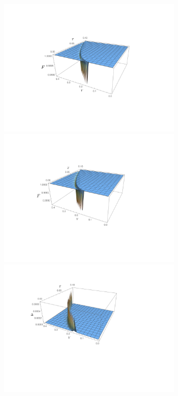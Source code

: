 \begin{figure}[h!]
\begin{minipage}{0.24\textwidth}
\includegraphics[width=0.8\textwidth,height=0.6\textwidth]{BCS_fidelity_theta.pdf}
\end{minipage}%
\begin{minipage}{0.24\textwidth}
\includegraphics[width=0.8\textwidth,height=0.6\textwidth]{BCS_fidelity_T.pdf}
\end{minipage}
\begin{minipage}{0.24\textwidth}
\includegraphics[width=0.8\textwidth,height=0.6\textwidth]{BCS_delta_theta.pdf}

\end{minipage}
\end{figure}

